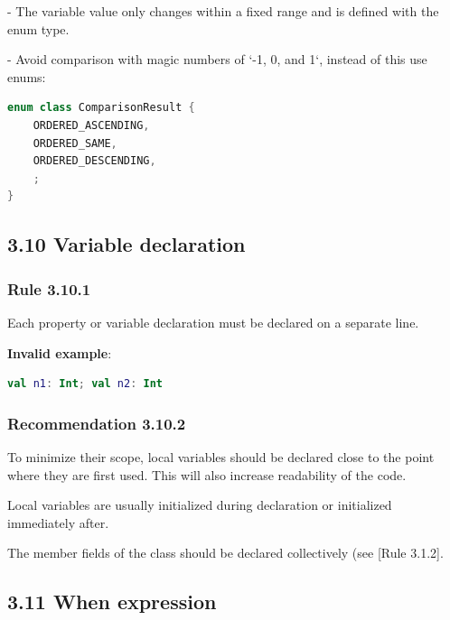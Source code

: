 {{{{- The variable value only changes within a fixed range and is defined with the enum type. 

- Avoid comparison with magic numbers of `-1, 0, and 1`, instead of this use enums:



\begin{lstlisting}[language=Kotlin]
enum class ComparisonResult {
    ORDERED_ASCENDING,
    ORDERED_SAME,
    ORDERED_DESCENDING,
    ;
}
\end{lstlisting}


\subsection*{\textbf{3.10 Variable declaration}}

\subsubsection*{\textbf{Rule 3.10.1}}
\leavevmode\newline



Each property or variable declaration must be declared on a separate line. 



\textbf{Invalid example}:

\begin{lstlisting}[language=Kotlin]
val n1: Int; val n2: Int
\end{lstlisting}


\subsubsection*{\textbf{Recommendation 3.10.2}}
\leavevmode\newline

To minimize their scope, local variables should be declared close to the point where they are first used. This will also increase readability of the code.

Local variables are usually initialized during declaration or initialized immediately after.

The member fields of the class should be declared collectively (see [Rule 3.1.2].



\subsection*{\textbf{3.11 When expression}}

}}}}
